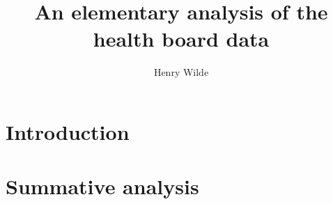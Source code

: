 \documentclass{article}
\title{An elementary analysis of the health board data}
\author{Henry Wilde}
\begin{document}
\maketitle

\section{Introduction}\label{sec:intro}


\section{Summative analysis}\label{sec:summative}

\end{document}
